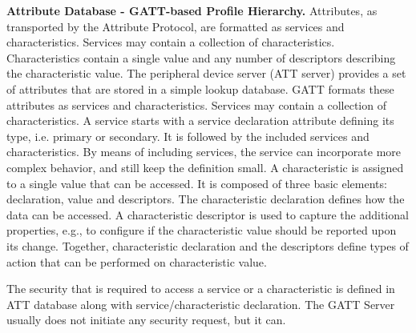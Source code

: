 \textbf{Attribute Database - GATT-based Profile Hierarchy.}
Attributes, as transported by the Attribute Protocol, are formatted as services and characteristics. Services may contain a collection of characteristics. Characteristics contain a single value and any number of descriptors describing the characteristic value. The peripheral device server (ATT server) provides a set of attributes that are stored in a simple lookup database. GATT formats these attributes as services and characteristics. Services may contain a collection of characteristics. A service starts with a service declaration attribute defining its type, i.e. primary or secondary. It is followed by the included services and characteristics. By means of including services, the service can incorporate more complex behavior, and still keep the definition small. A characteristic is assigned to a single value that can be accessed. It is composed of three basic elements: declaration, value and descriptors. The characteristic declaration defines how the data can be accessed. A characteristic descriptor is used to capture the additional properties, e.g., to configure if the characteristic value should be reported upon its change. Together, characteristic declaration and the descriptors define types of action that can be performed on characteristic value.

The security that is required to access a service or a characteristic is defined in ATT database along with service/characteristic declaration. The GATT Server usually does not initiate any security request, but it can. 

 \\

